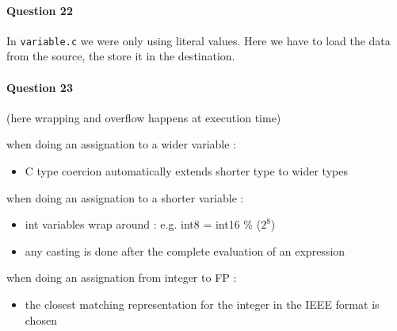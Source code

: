 \documentclass[10pt]{article}
\begin{document}
\paragraph{Question 22}

In \verb!variable.c! we were only using literal values. Here we have to load the data from the source,
the store it in the destination.


\paragraph{Question 23}

(here wrapping and overflow happens at execution time)

when doing an assignation to a wider variable :

\begin{itemize}
	\item C type coercion automatically extends shorter type to wider types
\end{itemize}

when doing an assignation to a shorter variable :

\begin{itemize}
	\item int variables wrap around : e.g. int8 = int16 \% ($2^8$)
	\item any casting is done after the complete evaluation of an expression
\end{itemize}

when doing an assignation from integer to FP :

\begin{itemize}
	\item the closest matching representation for the integer in the IEEE format is chosen
\end{itemize}
\end{document}
